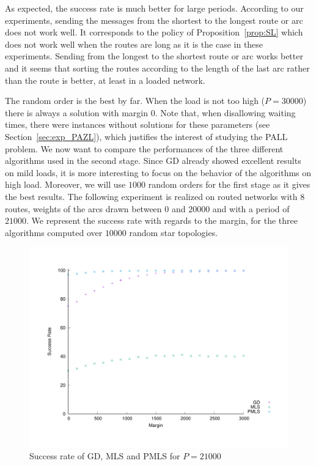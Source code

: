 \documentclass[a4paper,10pt]{article}
\begin{document}
     As expected, the  success rate is much better for large periods. According to our experiments, sending the messages from the shortest to the longest route or arc does not work well. It corresponds to the policy of Proposition~\ref{prop:SL} which does not work well when the routes are long as it is the case in these experiments. Sending from the longest to the shortest route or arc works better and it seems that sorting the routes according to the length of the last arc rather than the route is better, at least in a loaded network. 
     
     The random order is the best by far. When the load is not too high ($P = 30000$) there is always a solution with margin $0$.
     Note that, when disallowing waiting times, there were instances without solutions for these parameters (see Section~\ref{sec:exp_PAZL}), which justifies the interest of studying the PALL problem. We now want to compare the performances of the three different algorithms used in the second stage. Since GD already showed excellent results on mild loads, it is more interesting to focus on the behavior of the algorithms on high load. Moreover, we will use $1000$ random orders for the first stage as it gives the best results. The following experiment is realized on routed networks with $8$ routes, weights of the arcs drawn between $0$ and $20000$ and with a period of $21000$.  We represent the success rate with regards to the margin, for the three algorithms computed over $10000$ random star topologies. 
   

 
    \begin{figure} [H] 
       \begin{center}
      \includegraphics[scale=0.45]{retour_21000.pdf}
      \end{center}
      \caption{Success rate of GD, MLS and PMLS for $P = 21000$}
     \label{fig:success21000}
     \end{figure}
     
\end{document}

